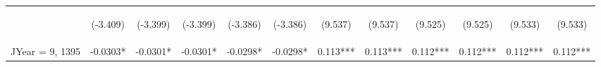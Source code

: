 \documentclass[]{article}
\begin{document}
\begin{center}
\begin{tabular}{lccccccccccc}
        \vspace{4pt}     & \begin{footnotesize}(-3.409)\end{footnotesize} & \begin{footnotesize}(-3.399)\end{footnotesize} & \begin{footnotesize}(-3.399)\end{footnotesize} & \begin{footnotesize}(-3.386)\end{footnotesize} & \begin{footnotesize}(-3.386)\end{footnotesize} & \begin{footnotesize}(9.537)\end{footnotesize}   & \begin{footnotesize}(9.537)\end{footnotesize}   & \begin{footnotesize}(9.525)\end{footnotesize}  & \begin{footnotesize}(9.525)\end{footnotesize}  & \begin{footnotesize}(9.533)\end{footnotesize}  & \begin{footnotesize}(9.533)\end{footnotesize}  \\
        JYear = 9, 1395  & -0.0303*                                       & -0.0301*                                       & -0.0301*                                       & -0.0298*                                       & -0.0298*                                       & 0.113***                                        & 0.113***                                        & 0.112***                                       & 0.112***                                       & 0.112***                                       & 0.112***                                       \\

\end{tabular}
\end{center}
\end{document}
